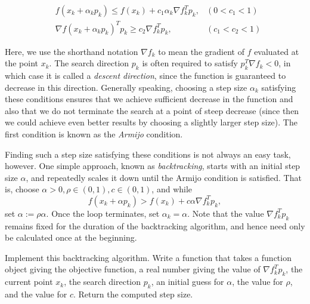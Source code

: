 \begin{align*}
&f(x_k + \alpha_kp_k) \leq f(x_k) + c_1\alpha_k\nabla f_k^Tp_k, &(0 < c_1 < 1)
\\ &\nabla f(x_k + \alpha_kp_k)^Tp_k \geq c_2\nabla f_k^Tp_k, &(c_1 < c_2 < 1)
\end{align*}

Here, we use the shorthand notation $\nabla f_k$ to
mean the gradient of $f$ evaluated at the point $x_k$. The search direction $p_k$ is
often required to satisfy $p_k^T \nabla f_k < 0$, in which case it is called a
\emph{descent direction}, since the function is guaranteed to decrease in
this direction. Generally speaking, choosing a step size $\alpha_k$ satisfying these conditions
ensures that we achieve sufficient decrease in the function and also that we do not
terminate the search at a point of steep decrease (since then we could achieve even
better results by choosing a slightly larger step size). The first condition is known
as the \emph{Armijo} condition.

Finding such a step size satisfying these conditions is not always an easy task, however.
One simple approach, known as \emph{backtracking}, starts with an initial step size
$\alpha$, and repeatedly scales it down until the Armijo condition is satisfied.
That is, choose $\alpha >0, \rho \in (0, 1), c\in (0, 1)$, and while
$$
f(x_k + \alpha p_k) > f(x_k) + c\alpha\nabla f_k^Tp_k,
$$
set $\alpha := \rho\alpha$. Once the loop terminates, set $\alpha_k = \alpha$. Note that the value
$\nabla f_k^Tp_k$ remains fixed for the duration of the backtracking algorithm, and hence need only
be calculated once at the beginning.
%

\begin{problem}
Implement this backtracking algorithm. Write a function  that takes a function
object giving the objective function, a real number giving the value of $\nabla f_k^Tp_k$, the
current point $x_k$, the search direction $p_k$, an initial guess for $\alpha$, the value for
$\rho$, and the value for $c$. Return the computed step size.
\end{problem}

